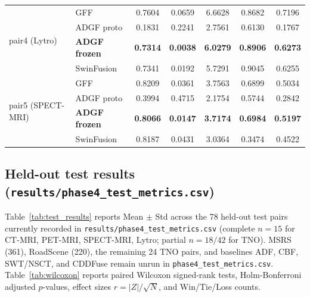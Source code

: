 \documentclass[conference]{IEEEtran}
\begin{document}
\begin{table}[htbp]
\begin{tabular}{llccccc}
\multirow{4}{*}{pair4 (Lytro)}
& GFF & 0.7604 & 0.0659 & 6.6628 & 0.8682 & 0.7196 \\
& ADGF proto & 0.1831 & 0.2241 & 2.7561 & 0.6130 & 0.1767 \\
& \textbf{ADGF frozen} & \textbf{0.7314} & \textbf{0.0038} & \textbf{6.0279} & \textbf{0.8906} & \textbf{0.6273} \\
& SwinFusion & 0.7341 & 0.0192 & 5.7291 & 0.9045 & 0.6255 \\
\midrule
\multirow{4}{*}{pair5 (SPECT-MRI)}
& GFF & 0.8209 & 0.0361 & 3.7563 & 0.6899 & 0.5034 \\
& ADGF proto & 0.3994 & 0.4715 & 2.1754 & 0.5744 & 0.2842 \\
& \textbf{ADGF frozen} & \textbf{0.8066} & \textbf{0.0147} & \textbf{3.7174} & \textbf{0.6984} & \textbf{0.5197} \\
& SwinFusion & 0.8187 & 0.0431 & 3.0364 & 0.3474 & 0.4522 \\
\bottomrule
\end{tabular}
\end{table}

\subsection{Held-out test results (\texttt{results/phase4\_test\_metrics.csv})}
Table~\ref{tab:test_results} reports Mean $\pm$ Std across the 78 held-out test pairs currently recorded in \texttt{results/phase4\_test\_metrics.csv} (complete $n=15$ for CT-MRI, PET-MRI, SPECT-MRI, Lytro; partial $n=18/42$ for TNO). MSRS (361), RoadScene (220), the remaining 24 TNO pairs, and baselines ADF, CBF, SWT/NSCT, and CDDFuse remain unrun in \texttt{phase4\_test\_metrics.csv}. Table~\ref{tab:wilcoxon} reports paired Wilcoxon signed-rank tests, Holm-Bonferroni adjusted $p$-values, effect sizes $r=|Z|/\sqrt{N}$, and Win/Tie/Loss counts.
\end{document}
